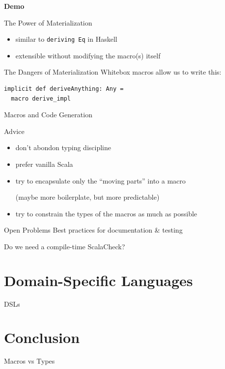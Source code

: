 \documentclass{beamer}
\newcommand\demoslide{
  {
    \setbeamertemplate{background}{}
    \begin{frame}[plain]
      \begin{center}\Large\bfseries Demo\end{center}
    \end{frame}
  }
}
\begin{document}
\demoslide

\begin{frame}{The Power of Materialization}
  \begin{itemize}
    \item similar to \texttt{deriving Eq} in Haskell
    \item extensible without modifying the macro(s) itself
  \end{itemize}
\end{frame}

\begin{frame}[fragile]{The Dangers of Materialization}
  Whitebox macros allow us to write this:
  \vspace{1em}

  \begin{verbatim}
implicit def deriveAnything: Any =
  macro derive_impl
  \end{verbatim}
\end{frame}

\begin{frame}{Macros and Code Generation}
  \begin{block}{Advice}
    \begin{itemize}
      \item don't abondon typing discipline
      \item prefer vanilla Scala
      \item try to encapsulate only the ``moving parts'' into a macro

        (maybe more boilerplate, but more predictable)
      \item try to constrain the types of the macros as much as possible
    \end{itemize}
  \end{block}
  \vspace{1em}

  \begin{block}{Open Problems}
    Best practices for documentation \& testing
    \vspace{1em}

    Do we need a compile-time ScalaCheck?
  \end{block}
\end{frame}

  \section{Domain-Specific Languages}

\begin{frame}{DSLs}
\end{frame}

  \section{Conclusion}

\begin{frame}{Macros vs Types}
\end{frame}
\end{document}
